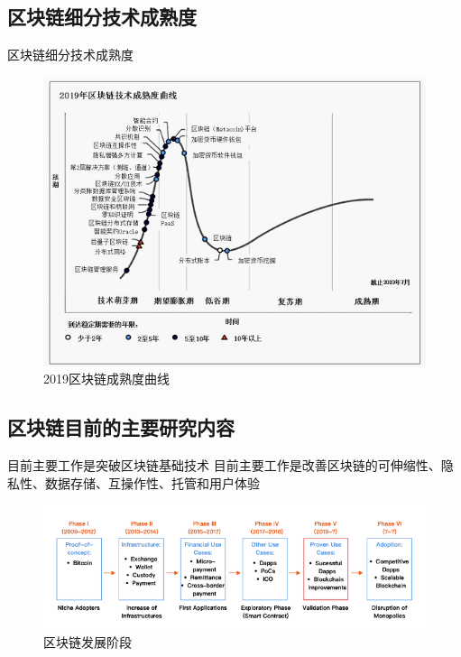 \documentclass[11pt]{beamer}
\begin{document}
\subsection{区块链细分技术成熟度}
\begin{frame}{区块链细分技术成熟度}
	\begin{figure}
		\centering
		\includegraphics[width=0.7\linewidth]{figures/2019区块链成熟度曲线}
		\caption{2019区块链成熟度曲线}
		\label{fig:2019blockchainpostion}
	\end{figure}
\end{frame}

\subsection{区块链目前的主要研究内容}
\begin{frame}{目前主要工作是突破区块链基础技术}
	目前主要工作是改善区块链的可伸缩性、隐私性、数据存储、互操作性、托管和用户体验
	\begin{figure}
		\centering
		\includegraphics[width=0.9\linewidth]{figures/blockchainsteps}
		\caption{区块链发展阶段}
		\label{fig:blockchainsteps}
	\end{figure}

\end{frame}
\end{document}
